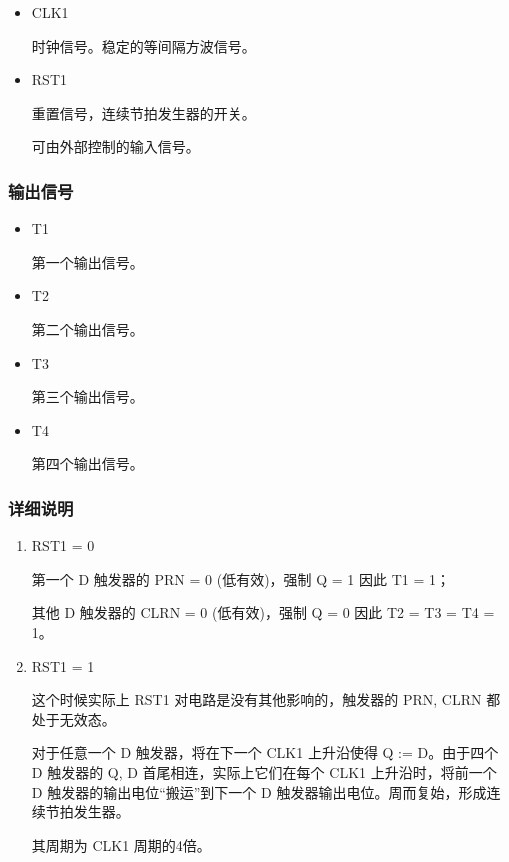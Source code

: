\begin{itemize}
    \item CLK1
    
    时钟信号。稳定的等间隔方波信号。
    
    \item RST1
    
    重置信号，连续节拍发生器的开关。
    
    可由外部控制的输入信号。
    
\end{itemize} 

\subsubsection{输出信号}

\begin{itemize}
    \item T1
    
    第一个输出信号。
    
    \item T2
    
    第二个输出信号。

    \item T3

    第三个输出信号。

    \item T4
    
    第四个输出信号。

\end{itemize}

\subsubsection{详细说明}

\begin{enumerate}
    \item RST1 = 0
    
    第一个 D 触发器的 PRN = 0 (低有效)，强制 Q = 1 因此 T1 = 1；
    
    其他 D 触发器的 CLRN = 0 (低有效)，强制 Q = 0 因此 T2 = T3 = T4 = 1。
    
    \item RST1 = 1
    
    这个时候实际上 RST1 对电路是没有其他影响的，触发器的 PRN, CLRN 都处于无效态。
    
    对于任意一个 D 触发器，将在下一个 CLK1 上升沿使得 Q := D。由于四个 D 触发器的 Q, D 首尾相连，实际上它们在每个 CLK1 上升沿时，将前一个 D 触发器的输出电位“搬运”到下一个 D 触发器输出电位。周而复始，形成连续节拍发生器。
    
    其周期为 CLK1 周期的4倍。
    
\end{enumerate}

